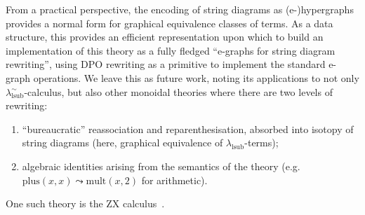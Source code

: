 From a practical perspective, the encoding of string diagrams as (e-)hypergraphs provides a normal form for graphical equivalence classes of terms.
As a data structure, this provides an efficient representation upon which to build an implementation of this theory as a fully fledged \enquote{e-graphs for string diagram rewriting}, using DPO rewriting as a primitive to implement the standard e-graph operations.
We leave this as future work, noting its applications to not only $\lambda^\sim_{\text{lsub}}$-calculus, but also other monoidal theories where there are two levels of rewriting:
\begin{enumerate}
	\item \enquote{bureaucratic} reassociation and reparenthesisation, absorbed into isotopy of string diagrams (here, graphical equivalence of $\lambda_{\text{lsub}}$-terms);
	\item algebraic identities arising from the semantics of the theory (e.g. ${\text{plus} (x, x) \leadsto \text{mult} (x, 2)}$ for arithmetic).
\end{enumerate}
One such theory is the ZX calculus~\cite{coeckeInteractingQuantumObservables2011}.
